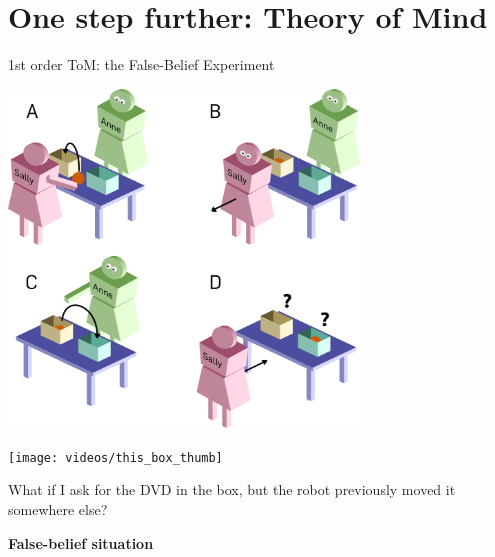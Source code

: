 \documentclass[compress,xcolor=table]{beamer}
\begin{document}
\section[Theory of Mind]{One step further: Theory of Mind}
%
{ \paper{Wimmer and Perner, {\bf Beliefs about beliefs: Representation and
constraining function [...]}, Cognition, 1983]%
}
\begin{frame}{1st order ToM: the False-Belief Experiment}

        \begin{center} 
            \includegraphics[width=0.7\textwidth]{sally_ann.pdf}
        \end{center}
\end{frame}
}

\begin{frame}[plain]

    \begin{center}
        \texttt{[image: videos/this\_box\_thumb]}

        What if I ask for the DVD in the box, but the robot previously
        moved it somewhere else?


    \pause

        {\bf False-belief situation}
    \end{center}
\end{frame}

\end{document}
